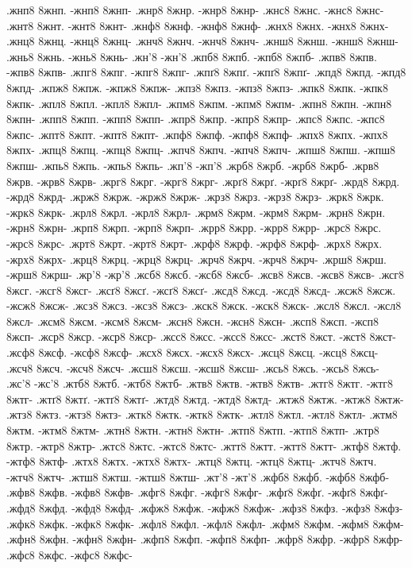 {.жнп8 8жнп. -жнп8 8жнп-
.жнр8 8жнр. -жнр8 8жнр-
.жнс8 8жнс. -жнс8 8жнс-
.жнт8 8жнт. -жнт8 8жнт-
.жнф8 8жнф. -жнф8 8жнф-
.жнх8 8жнх. -жнх8 8жнх-
.жнц8 8жнц. -жнц8 8жнц-
.жнч8 8жнч. -жнч8 8жнч-
.жнш8 8жнш. -жнш8 8жнш-
.жнь8 8жнь. -жнь8 8жнь-
.жн'8 -жн'8
.жпб8 8жпб. -жпб8 8жпб-
.жпв8 8жпв. -жпв8 8жпв-
.жпг8 8жпг. -жпг8 8жпг-
.жпґ8 8жпґ. -жпґ8 8жпґ-
.жпд8 8жпд. -жпд8 8жпд-
.жпж8 8жпж. -жпж8 8жпж-
.жпз8 8жпз. -жпз8 8жпз-
.жпк8 8жпк. -жпк8 8жпк-
.жпл8 8жпл. -жпл8 8жпл-
.жпм8 8жпм. -жпм8 8жпм-
.жпн8 8жпн. -жпн8 8жпн-
.жпп8 8жпп. -жпп8 8жпп-
.жпр8 8жпр. -жпр8 8жпр-
.жпс8 8жпс. -жпс8 8жпс-
.жпт8 8жпт. -жпт8 8жпт-
.жпф8 8жпф. -жпф8 8жпф-
.жпх8 8жпх. -жпх8 8жпх-
.жпц8 8жпц. -жпц8 8жпц-
.жпч8 8жпч. -жпч8 8жпч-
.жпш8 8жпш. -жпш8 8жпш-
.жпь8 8жпь. -жпь8 8жпь-
.жп'8 -жп'8
.жрб8 8жрб. -жрб8 8жрб-
.жрв8 8жрв. -жрв8 8жрв-
.жрг8 8жрг. -жрг8 8жрг-
.жрґ8 8жрґ. -жрґ8 8жрґ-
.жрд8 8жрд. -жрд8 8жрд-
.жрж8 8жрж. -жрж8 8жрж-
.жрз8 8жрз. -жрз8 8жрз-
.жрк8 8жрк. -жрк8 8жрк-
.жрл8 8жрл. -жрл8 8жрл-
.жрм8 8жрм. -жрм8 8жрм-
.жрн8 8жрн. -жрн8 8жрн-
.жрп8 8жрп. -жрп8 8жрп-
.жрр8 8жрр. -жрр8 8жрр-
.жрс8 8жрс. -жрс8 8жрс-
.жрт8 8жрт. -жрт8 8жрт-
.жрф8 8жрф. -жрф8 8жрф-
.жрх8 8жрх. -жрх8 8жрх-
.жрц8 8жрц. -жрц8 8жрц-
.жрч8 8жрч. -жрч8 8жрч-
.жрш8 8жрш. -жрш8 8жрш-
.жр'8 -жр'8
.жсб8 8жсб. -жсб8 8жсб-
.жсв8 8жсв. -жсв8 8жсв-
.жсг8 8жсг. -жсг8 8жсг-
.жсґ8 8жсґ. -жсґ8 8жсґ-
.жсд8 8жсд. -жсд8 8жсд-
.жсж8 8жсж. -жсж8 8жсж-
.жсз8 8жсз. -жсз8 8жсз-
.жск8 8жск. -жск8 8жск-
.жсл8 8жсл. -жсл8 8жсл-
.жсм8 8жсм. -жсм8 8жсм-
.жсн8 8жсн. -жсн8 8жсн-
.жсп8 8жсп. -жсп8 8жсп-
.жср8 8жср. -жср8 8жср-
.жсс8 8жсс. -жсс8 8жсс-
.жст8 8жст. -жст8 8жст-
.жсф8 8жсф. -жсф8 8жсф-
.жсх8 8жсх. -жсх8 8жсх-
.жсц8 8жсц. -жсц8 8жсц-
.жсч8 8жсч. -жсч8 8жсч-
.жсш8 8жсш. -жсш8 8жсш-
.жсь8 8жсь. -жсь8 8жсь-
.жс'8 -жс'8
.жтб8 8жтб. -жтб8 8жтб-
.жтв8 8жтв. -жтв8 8жтв-
.жтг8 8жтг. -жтг8 8жтг-
.жтґ8 8жтґ. -жтґ8 8жтґ-
.жтд8 8жтд. -жтд8 8жтд-
.жтж8 8жтж. -жтж8 8жтж-
.жтз8 8жтз. -жтз8 8жтз-
.жтк8 8жтк. -жтк8 8жтк-
.жтл8 8жтл. -жтл8 8жтл-
.жтм8 8жтм. -жтм8 8жтм-
.жтн8 8жтн. -жтн8 8жтн-
.жтп8 8жтп. -жтп8 8жтп-
.жтр8 8жтр. -жтр8 8жтр-
.жтс8 8жтс. -жтс8 8жтс-
.жтт8 8жтт. -жтт8 8жтт-
.жтф8 8жтф. -жтф8 8жтф-
.жтх8 8жтх. -жтх8 8жтх-
.жтц8 8жтц. -жтц8 8жтц-
.жтч8 8жтч. -жтч8 8жтч-
.жтш8 8жтш. -жтш8 8жтш-
.жт'8 -жт'8
.жфб8 8жфб. -жфб8 8жфб-
.жфв8 8жфв. -жфв8 8жфв-
.жфг8 8жфг. -жфг8 8жфг-
.жфґ8 8жфґ. -жфґ8 8жфґ-
.жфд8 8жфд. -жфд8 8жфд-
.жфж8 8жфж. -жфж8 8жфж-
.жфз8 8жфз. -жфз8 8жфз-
.жфк8 8жфк. -жфк8 8жфк-
.жфл8 8жфл. -жфл8 8жфл-
.жфм8 8жфм. -жфм8 8жфм-
.жфн8 8жфн. -жфн8 8жфн-
.жфп8 8жфп. -жфп8 8жфп-
.жфр8 8жфр. -жфр8 8жфр-
.жфс8 8жфс. -жфс8 8жфс-
}

